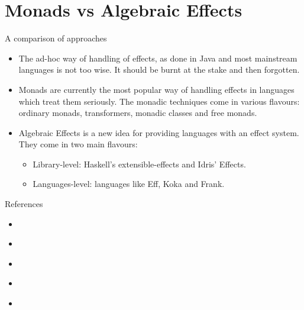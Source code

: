 \documentclass{beamer}
\newcommand{\link}[2]{\href{#2}{\color{blue}{#1}}}
\begin{document}
\section{Monads vs Algebraic Effects}

\begin{frame}{A comparison of approaches}
\begin{itemize}
	\item The ad-hoc way of handling of effects, as done in Java and most mainstream languages is not too wise. It should be burnt at the stake and then forgotten.
	\item Monads are currently the most popular way of handling effects in languages which treat them seriously. The monadic techniques come in various flavours: ordinary monads, transformers, monadic classes and free monads.
	\item Algebraic Effects is a new idea for providing languages with an effect system. They come in two main flavours:
	\begin{itemize}
		\item Library-level: Haskell's extensible-effects and Idris' Effects.
		\item Languages-level: languages like Eff, Koka and Frank.
	\end{itemize}
\end{itemize}
\end{frame}

\begin{frame}{References}
\begin{itemize}
	\item \link{Referential transparency}{https://stackoverflow.com/questions/210835/what-is-referential-transparency}
	\item \link{Free monads}{http://www.haskellforall.com/2012/07/purify-code-using-free-monads.html}
	\item \link{Idris}{http://docs.idris-lang.org/en/latest/index.html}
	\item \link{Koka}{https://koka-lang.github.io/koka/doc/kokaspec.html}
	\item \link{Repo with code of the examples (and of these slides)}{https://github.com/Zeimer/AlgEff}
\end{itemize}
\end{frame}
\end{document}
